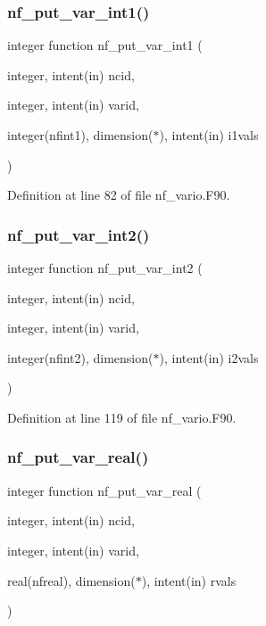 \subsubsection{\texorpdfstring{nf\+\_\+put\+\_\+var\+\_\+int1()}{nf\_put\_var\_int1()}}
{\footnotesize\ttfamily integer function nf\+\_\+put\+\_\+var\+\_\+int1 (\begin{DoxyParamCaption}\item[{integer, intent(in)}]{ncid,  }\item[{integer, intent(in)}]{varid,  }\item[{integer(nfint1), dimension($\ast$), intent(in)}]{i1vals }\end{DoxyParamCaption})}



Definition at line 82 of file nf\+\_\+vario.\+F90.

\mbox{\label{nf__vario_8F90_a6dcf362466db413504084fdb0c8addf2}} 
\subsubsection{\texorpdfstring{nf\+\_\+put\+\_\+var\+\_\+int2()}{nf\_put\_var\_int2()}}
{\footnotesize\ttfamily integer function nf\+\_\+put\+\_\+var\+\_\+int2 (\begin{DoxyParamCaption}\item[{integer, intent(in)}]{ncid,  }\item[{integer, intent(in)}]{varid,  }\item[{integer(nfint2), dimension($\ast$), intent(in)}]{i2vals }\end{DoxyParamCaption})}



Definition at line 119 of file nf\+\_\+vario.\+F90.

\mbox{\label{nf__vario_8F90_a177ab75735fe71acce3e96be7e2a58d2}} 
\subsubsection{\texorpdfstring{nf\+\_\+put\+\_\+var\+\_\+real()}{nf\_put\_var\_real()}}
{\footnotesize\ttfamily integer function nf\+\_\+put\+\_\+var\+\_\+real (\begin{DoxyParamCaption}\item[{integer, intent(in)}]{ncid,  }\item[{integer, intent(in)}]{varid,  }\item[{real(nfreal), dimension($\ast$), intent(in)}]{rvals }\end{DoxyParamCaption})}



